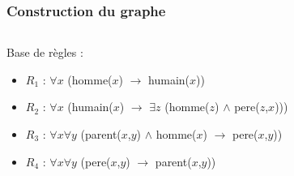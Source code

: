 \begin{frame}
	\frametitle{Construction du graphe}
	\begin{columns}
	\begin{column}{0.55\linewidth}
		Base de règles :
		\begin{itemize}
			\item $R_1$ : $\forall x$ (homme($x$) $\rightarrow$ humain($x$))
			\item $R_2$ : $\forall x$ (humain($x$) $\rightarrow$ $\exists z$ (homme($z$)
			$\wedge$ pere($z$,$x$)))
			\item $R_3$ : $\forall x \forall y$ (parent($x$,$y$) $\wedge$ homme($x$)
			$\rightarrow$ pere($x$,$y$))
			\item $R_4$ : $\forall x \forall y$ (pere($x$,$y$) $\rightarrow$
			parent($x$,$y$))
		\end{itemize}
	\end{column}
	\vline
	\hfill
	\begin{column}{0.35\linewidth}
		\begin{figure}
		\end{figure}
	\end{column}
	\end{columns}
\end{frame}

